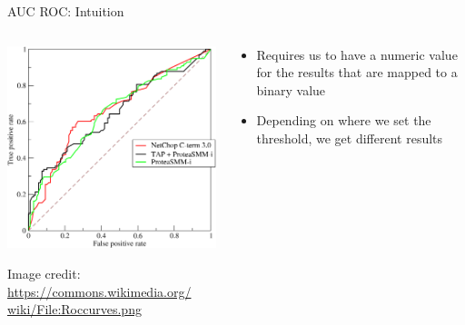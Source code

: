 \documentclass[aspectratio=169]{beamer}
\begin{document}
\begin{frame}{AUC ROC: Intuition}

\begin{columns}
\begin{column}{0.5\textwidth}
    \includegraphics[width=1\textwidth]{lectSup/Roccurves} %

   
   \vspace{-1em}
    {\tiny Image credit: \url{https://commons.wikimedia.org/
    wiki/File:Roccurves.png}}

\end{column}
\begin{column}{0.5\textwidth}

\begin{itemize}
	\item Requires us to have a numeric value for the results that are mapped to a binary value
	\item Depending on where we set the threshold, we get different results
\end{itemize}
\end{column}
\end{columns}
\end{frame}
\end{document}
